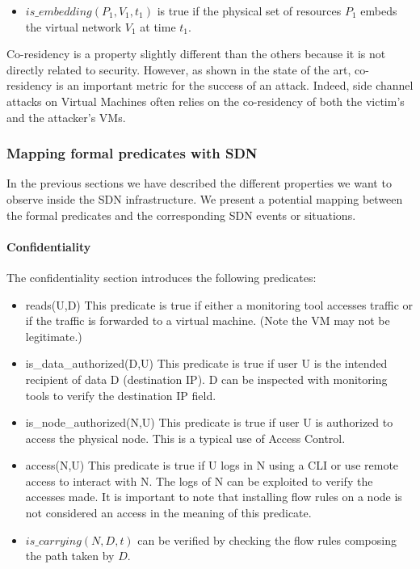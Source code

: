 \begin{itemize}
    \item $is\_embedding(P_1,V_1,t_1)$ is true if the physical set of resources $P_1$ embeds the virtual network $V_1$ at time $t_1$.
\end{itemize}

Co-residency is a property slightly different than the others because it is not directly related to security.
However, as shown in the state of the art, co-residency is an important metric for the success of an attack.
Indeed, side channel attacks on Virtual Machines often relies on the co-residency of both the victim's and the attacker's VMs.



\subsubsection{Mapping formal predicates with SDN}
\label{sec:mapping-model}
In the previous sections we have described the different properties we want to observe inside the SDN infrastructure.
We present a potential mapping between the formal predicates and the corresponding SDN events or situations.


\paragraph{Confidentiality}
The confidentiality section introduces the following predicates:
\begin{itemize}
\item reads(U,D)
\newline
This predicate is true if either a monitoring tool accesses traffic or if the traffic is forwarded to a virtual machine. (Note the VM may not be legitimate.)

\item is\_data\_authorized(D,U)
\newline
This predicate is true if user U is the intended recipient of data D (\eg destination IP).
D can be inspected with monitoring tools to verify the destination IP field.
\item is\_node\_authorized(N,U)
\newline
This predicate is true if user U is authorized to access the physical node.
This is a typical use of Access Control.
\item access(N,U)
\newline
This predicate is true if U logs in N using a CLI or use remote access to interact with N.
The logs of N can be exploited to verify the accesses made.
It is important to note that installing flow rules on a node is not considered an access in the meaning of this predicate.

\item $is\_carrying(N,D,t)$ can be verified by checking the flow rules composing the path taken by $D$.
\end{itemize}

